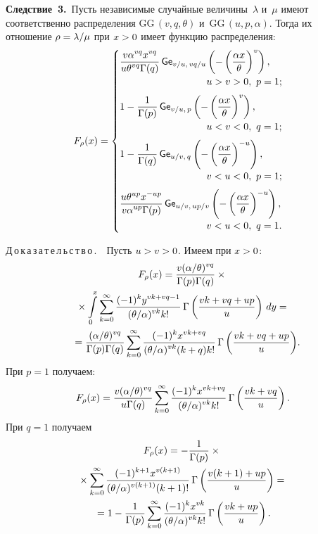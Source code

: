 \begin{multicols}{2}
\noindent
\textbf{Следствие~3.}\
Пусть независимые случайные величины~$\lambda$ и~$\mu$ имеют соответственно 
распределения $\mathrm{GG}\,(v,q,\theta)$ и~$\mathrm{GG}\,(u,p,\alpha)$. Тогда их отношение 
$\rho\hm=\lambda/\mu$ при $x\hm>0$ имеет функцию распределения:
$$
F_{\rho}(x) =
 \begin{cases}
   \displaystyle \fr{{v}\alpha^{vq}x^{vq}}{u\theta^{vq}\Gamma(q)}\,
{\sf Ge}_{v/u,\,vq/u}\left(-\left(\fr{\alpha x}{\theta}\right)^v\right), 
&\\[6pt]
&\hspace*{-30mm}u>v>0,\ p=1;\\[6pt]
   \displaystyle 1-\fr{1}{\Gamma(p)}\,{\sf Ge}_{v/u,\,p}\left(-\left(\fr{\alpha 
x}{\theta}\right)^v\right), &\\[6pt]
&\hspace*{-30mm}u<v<0,\ q=1;\\[6pt]
   \displaystyle 1-\fr{1}{\Gamma(q)}\,{\sf Ge}_{u/v,\,q}\left(-\left(\fr{\alpha 
x}{\theta}\right)^{-u}\right), &\\[6pt]
&\hspace*{-30mm}v<u<0,\ p=1;\\[6pt]
   \displaystyle \fr{u\theta^{up}x^{-up}}{v\alpha^{up}\Gamma(p)}\,
{\sf Ge}_{u/v,\,up/v}\left(-\left(\fr{\alpha x}{\theta}\right)^{-u}\right), 
&\\[6pt]
&\hspace*{-30mm}v<u<0,\ q=1.
 \end{cases}
$$

\noindent
Д\,о\,к\,а\,з\,а\,т\,е\,л\,ь\,с\,т\,в\,о\,.\ \ Пусть $u\hm>v\hm>0$. Имеем при $x\hm>0$:
\begin{multline*}
F_\rho(x)=\displaystyle\frac{\displaystyle {v}(\alpha/\theta)^{vq}\mathstrut}{\displaystyle \Gamma(p)\Gamma(q)\mathstrut}\times{}\\
{}\times\int\limits_0^x
\sum\limits_{k=0}^{\infty}\displaystyle\frac{\displaystyle (-1)^ky^{vk+vq-1}\mathstrut}{\displaystyle (\theta/\alpha)^{vk}k!\mathstrut} 
\,\Gamma\left(\displaystyle\frac{\displaystyle  vk + vq+up\mathstrut}{\displaystyle u\mathstrut}\right)\, dy={}\\
\!{}=\displaystyle\frac{\displaystyle (\alpha/\theta)^{vq}\mathstrut}{\displaystyle \Gamma(p)\Gamma(q)\mathstrut}
\sum\limits_{k=0}^{\infty}\displaystyle\frac{\displaystyle (-1)^kx^{vk+vq}\mathstrut}{\displaystyle (\theta/\alpha)^{vk}(k+q)k!\mathstrut}\, 
\Gamma\left(\displaystyle\frac{\displaystyle  vk + vq+up\mathstrut}{\displaystyle u\mathstrut}\right)\!.\hspace*{-8.51317pt}
\end{multline*}
При $p=1$ получаем:
$$
F_\rho(x)=\displaystyle\frac{\displaystyle v(\alpha/\theta)^{vq}\mathstrut}{\displaystyle u\Gamma(q)\mathstrut}
\sum\limits_{k=0}^{\infty}\displaystyle\frac{\displaystyle (-1)^kx^{vk+vq}\mathstrut}{\displaystyle (\theta/\alpha)^{vk}k!\mathstrut} \,
\Gamma\left(\displaystyle\frac{\displaystyle  vk + vq\mathstrut}{\displaystyle u\mathstrut}\right).
$$
При $q=1$ получаем
\begin{multline*}
F_\rho(x)=-\displaystyle\frac{\displaystyle 1\mathstrut}{\displaystyle \Gamma(p)\mathstrut}\times{}\\
{}\times
\sum\limits_{k=0}^{\infty}\displaystyle\frac{\displaystyle (-1)^{k+1}x^{v(k+1)}\mathstrut}{\displaystyle (\theta/\alpha)^{v(k+1)}(k+1)!\mathstrut} \,
\Gamma\left(\displaystyle\frac{\displaystyle v(k+1) + up\mathstrut}{\displaystyle u\mathstrut}\right)={}\\
{}=1-\displaystyle\frac{\displaystyle 1\mathstrut}{\displaystyle \Gamma(p)\mathstrut}
\sum\limits_{k=0}^{\infty}\displaystyle\frac{\displaystyle (-1)^{k}x^{vk}\mathstrut}{\displaystyle (\theta/\alpha)^{vk}k!\mathstrut} 
\,\Gamma\left(\displaystyle\frac{\displaystyle vk + up\mathstrut}{\displaystyle u\mathstrut}\right).
\end{multline*}


\end{multicols}
